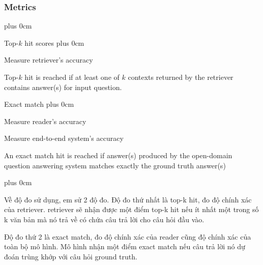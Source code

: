 \documentclass[11pt]{beamer}
\renewcommand{\raggedright}{\leftskip=0pt \rightskip=0pt plus 0cm}
\let\olditemize=\itemize
\renewenvironment{itemize}{\olditemize\raggedright}{\endlist}
\begin{document}
\begin{frame}
	\frametitle{Metrics}
	\begin{itemize}
		\item Top-$k$ hit scores
		\begin{itemize}
			\item Measure retriever's accuracy
			\item Top-$k$ hit is reached if at least one of $k$ contexts returned by the retriever contains answer(s) for input question. 
		\end{itemize}
		\item Exact match
		\begin{itemize}
			\item Measure reader's accuracy
			\item Measure end-to-end system's accuracy
			\item An exact match hit is reached if answer(s) produced by the open-domain question answering system matches exactly the ground truth answer(s)
		\end{itemize}
	\end{itemize}
\end{frame}
\begin{frame}
\begin{itemize}
	\item Về độ đo sử dụng, em sử 2 độ đo. Độ đo thứ nhất là top-k hit, đo độ chính xác của retriever. retriever sẽ nhận được một điểm top-k hit nếu ít nhất một trong số k văn bản mà nó trả về có chứa câu trả lời cho câu hỏi đầu vào.
	\item Độ đo thứ 2 là exact match, đo độ chính xác của reader cũng độ chính xác của toàn bộ mô hình. Mô hình nhận một điểm exact match nếu câu trả lời nó dự đoán trùng khớp với câu hỏi ground truth.
\end{itemize}
\end{frame}
\end{document}
